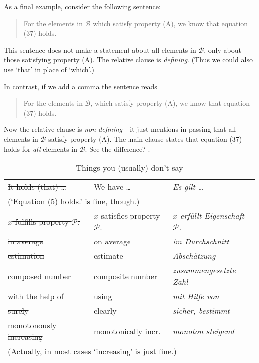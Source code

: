 As a final example, consider the following sentence:
\begin{quote}
  For the elements in \(\mathcal{B}\) which satisfy property (A), we
  know that equation (37) holds.
\end{quote}
This sentence does not make a statement about all elements in
\(\mathcal{B}\), only about those satisfying property (A). The relative
clause is \emph{defining}. (Thus we could also use `that' in place of
`which'.)

In contrast, if we add a comma the sentence reads
\begin{quote}
  For the elements in \(\mathcal{B}\), which satisfy property (A), we
  know that equation (37) holds.
\end{quote}

Now the relative clause is \emph{non-defining} -- it just mentions in
passing that all elements in \(\mathcal{B}\) satisfy property (A). The
main clause states that equation (37) holds for \emph{all} elements in
\(\mathcal{B}\). See the difference?
.

\begin{table}
  \centering
  \caption{Things you (usually) don't say}
  \label{tab:things-you-dont-say}
  \begin{tabular}{lll}
    \toprule
    \st{It holds (that) \dots} & We have \dots & \emph{Es gilt \dots}\\
    \multicolumn{3}{l}{\quad\footnotesize(`Equation (5) holds.' is fine, though.)}\\
    \st{$x$ fulfills property $\mathcal{P}$.}& \(x\) satisfies property \(\mathcal{P}\). & \emph{\(x\) erfüllt Eigenschaft \(\mathcal{P}\).} \\
    \st{in average} & on average & \emph{im Durchschnitt}\\
    \st{estimation} & estimate   & \emph{Abschätzung}\\
    \st{composed number} & composite number & \emph{zusammengesetzte Zahl}\\
    \st{with the help of} & using & \emph{mit Hilfe von}\\
    \st{surely} & clearly & \emph{sicher, bestimmt}\\
    \st{monotonously increasing} & monotonically incr. & \emph{monoton steigend}\\
    \multicolumn{3}{l}{\quad\footnotesize(Actually, in most cases `increasing' is just fine.)}\\
    \bottomrule
  \end{tabular}
\end{table}

